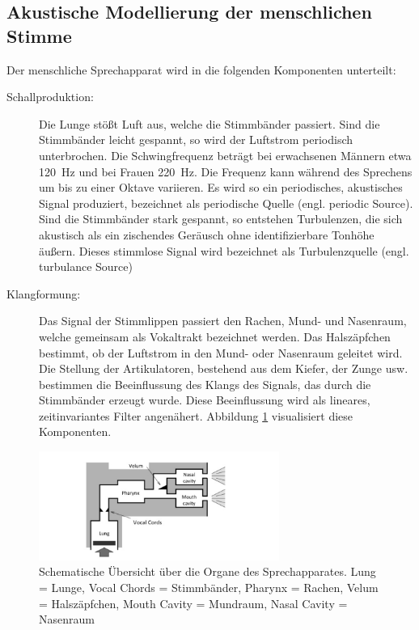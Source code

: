 \subsection{Akustische Modellierung der menschlichen Stimme}
\label{sec:theVoice}

Der menschliche Sprechapparat wird in die folgenden Komponenten unterteilt:

\begin{description}

\item[Schallproduktion: ] Die Lunge stößt Luft aus, welche die Stimmbänder passiert. Sind die Stimmbänder leicht gespannt, so wird der Luftstrom periodisch unterbrochen. Die Schwingfrequenz beträgt bei erwachsenen Männern etwa \SI{120}{\hertz} und bei Frauen \SI{220}{\hertz}. Die Frequenz kann während des Sprechens um bis zu einer Oktave variieren. Es wird so ein periodisches, akustisches Signal produziert, bezeichnet als \glqq periodische Quelle\grqq{} (engl. \glqq periodic Source\grqq). Sind die Stimmbänder stark gespannt, so entstehen Turbulenzen, die sich akustisch als ein zischendes Geräusch ohne identifizierbare Tonhöhe äußern. Dieses stimmlose Signal wird bezeichnet als \glqq Turbulenzquelle\grqq{} (engl. \glqq turbulance Source\grqq)
\item[Klangformung: ] Das Signal der Stimmlippen passiert den Rachen, Mund- und Nasenraum, welche gemeinsam als \glqq Vokaltrakt\grqq{} bezeichnet werden. Das Halszäpfchen bestimmt, ob der Luftstrom in den Mund- oder Nasenraum geleitet wird. Die Stellung der Artikulatoren, bestehend aus dem Kiefer, der Zunge usw. bestimmen die Beeinflussung des Klangs des Signals, das durch die Stimmbänder erzeugt wurde. Diese Beeinflussung wird als lineares, zeitinvariantes Filter angenähert. \cite[S. 62]{cryModel} \cite[S. 13]{sprachverarbeitung} Abbildung \ref{img:schematicVocalOrgans} visualisiert diese Komponenten.
\end{description}

\begin{figure}[h]
	\centering
	\includegraphics[width=0.7\textwidth]{bilder/SchematicVocalOrgans.png}
	\caption[Schematische Übersicht über die Organe des Sprechapparates]{Schematische Übersicht über die Organe des Sprechapparates. Lung = Lunge, Vocal Chords = Stimmbänder, Pharynx = Rachen, Velum = Halszäpfchen, Mouth Cavity = Mundraum, Nasal Cavity = Nasenraum \cite{speechProduction}}
	\label{img:schematicVocalOrgans}
\end{figure}	

